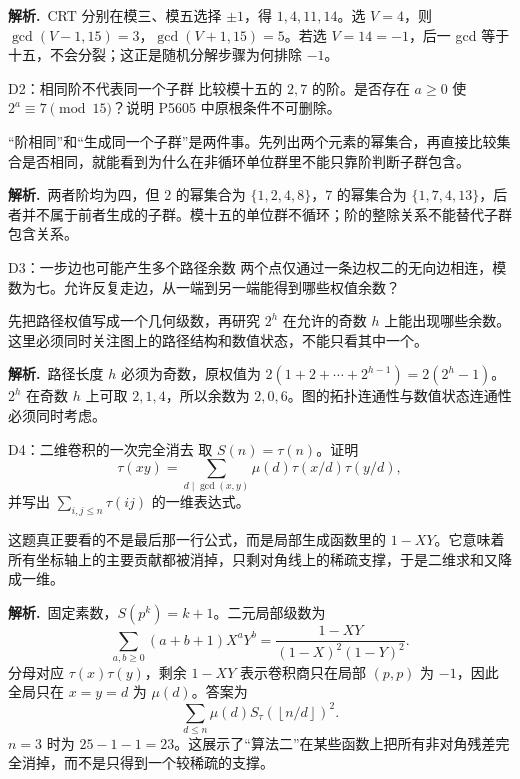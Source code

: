 \documentclass[UTF8,a4paper,11pt,twoside,openright,fontset=fandol]{ctexbook}
\theoremstyle{definition}
\newcommand{\floor}[1]{\left\lfloor #1\right\rfloor}
\newcommand{\sol}{\par\noindent\textbf{解析.}\ }
\begin{document}
\sol CRT 分别在模三、模五选择 $\pm1$，得 $1,4,11,14$。选 $V=4$，则 $\gcd(V-1,15)=3$，$\gcd(V+1,15)=5$。若选 $V=14=-1$，后一 gcd 等于十五，不会分裂；这正是随机分解步骤为何排除 $-1$。


\begin{problem}{D2：相同阶不代表同一个子群}
比较模十五的 $2,7$ 的阶。是否存在 $a\ge0$ 使 $2^a\equiv7\pmod{15}$？说明 P5605 中原根条件不可删除。
\end{problem}

\begin{pitfall}[讲解：先看这题到底在做什么]
“阶相同”和“生成同一个子群”是两件事。先列出两个元素的幂集合，再直接比较集合是否相同，就能看到为什么在非循环单位群里不能只靠阶判断子群包含。
\end{pitfall}

\sol 两者阶均为四，但 $2$ 的幂集合为 $\{1,2,4,8\}$，$7$ 的幂集合为 $\{1,7,4,13\}$，后者并不属于前者生成的子群。模十五的单位群不循环；阶的整除关系不能替代子群包含关系。


\begin{problem}{D3：一步边也可能产生多个路径余数}
两个点仅通过一条边权二的无向边相连，模数为七。允许反复走边，从一端到另一端能得到哪些权值余数？
\end{problem}

\begin{pitfall}[讲解：先看这题到底在做什么]
先把路径权值写成一个几何级数，再研究 $2^h$ 在允许的奇数 $h$ 上能出现哪些余数。这里必须同时关注图上的路径结构和数值状态，不能只看其中一个。
\end{pitfall}

\sol 路径长度 $h$ 必须为奇数，原权值为 $2(1+2+\cdots+2^{h-1})=2(2^h-1)$。$2^h$ 在奇数 $h$ 上可取 $2,1,4$，所以余数为 $2,0,6$。图的拓扑连通性与数值状态连通性必须同时考虑。


\begin{problem}{D4：二维卷积的一次完全消去}
取 $S(n)=\tau(n)$。证明
\[
 \tau(xy)=\sum_{d\mid\gcd(x,y)}\mu(d)\tau(x/d)\tau(y/d),
\]
并写出 $\sum_{i,j\le n}\tau(ij)$ 的一维表达式。
\end{problem}

\begin{pitfall}[讲解：先看这题到底在做什么]
这题真正要看的不是最后那一行公式，而是局部生成函数里的 $1-XY$。它意味着所有坐标轴上的主要贡献都被消掉，只剩对角线上的稀疏支撑，于是二维求和又降成一维。
\end{pitfall}

\sol 固定素数，$S(p^k)=k+1$。二元局部级数为
\[
 \sum_{a,b\ge0}(a+b+1)X^aY^b
 =\frac{1-XY}{(1-X)^2(1-Y)^2}.
\]
分母对应 $\tau(x)\tau(y)$，剩余 $1-XY$ 表示卷积商只在局部 $(p,p)$ 为 $-1$，因此全局只在 $x=y=d$ 为 $\mu(d)$。答案为
\[
 \sum_{d\le n}\mu(d)S_\tau(\floor{n/d})^2.
\]
$n=3$ 时为 $25-1-1=23$。这展示了“算法二”在某些函数上把所有非对角残差完全消掉，而不是只得到一个较稀疏的支撑。
\end{document}
